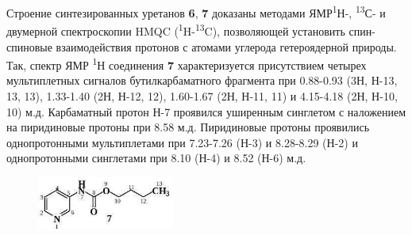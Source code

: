 \begin{multicols}{2}
Строение синтезированных уретанов {\bfseries 6}, {\bfseries 7} доказаны
методами ЯМР\textsuperscript{1}Н-, \textsuperscript{13}С- и двумерной
спектроскопии HMQC (\textsuperscript{1}H-\textsuperscript{13}C),
позволяющей установить спин-спиновые взаимодействия протонов с атомами
углерода гетероядерной природы. Так, спектр ЯМР \textsuperscript{1}Н
соединения {\bfseries 7} характеризуется присутствием четырех мультиплетных
сигналов бутилкарбаматного фрагмента при 0.88-0.93 (3Н, Н-13, 13, 13),
1.33-1.40 (2Н, Н-12, 12), 1.60-1.67 (2Н, Н-11, 11) и 4.15-4.18 (2Н,
Н-10, 10) м.д. Карбаматный протон Н-7 проявился уширенным синглетом с
наложением на пиридиновые протоны при 8.58 м.д. Пиридиновые протоны
проявились однопротонными мультиплетами при 7.23-7.26 (Н-3) и 8.28-8.29
(Н-2) и однопротонными синглетами при 8.10 (Н-4) и 8.52 (Н-6) м.д.
\end{multicols}

\begin{figure}[H]
	\centering
	\includegraphics[width=0.4\textwidth]{assets/6}
\end{figure}

